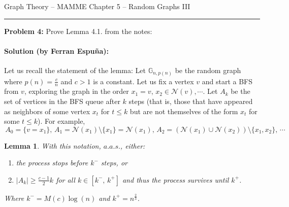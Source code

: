 \documentclass{amsart}
\theoremstyle{plain}
\newtheorem*{lemma}{\textbf{Lemma}}
\theoremstyle{definition}
\begin{document}
    {\Large Graph Theory -- MAMME}
    {\Large Chapter 5 -- Random Graphs III}

    \vspace{0.5cm}

    \hrule

    \vspace{0.5cm}

    \noindent \textbf{Problem 4:}
    Prove Lemma 4.1. from the notes:


    \paragraph{\textbf{Solution (by Ferran Espuña):}}
    Let us recall the statement of the lemma:
    Let $\mathbb{G}_{n,p(n)}$ be the random graph where $p(n) = \frac{c}{n}$ and $c > 1$ is a constant.
    Let us fix a vertex $v$ and start a BFS from $v$, exploring the graph in the order
    $x_1 = v,\, x_2 \in \mathcal{N}(v), \cdots$.
    Let $A_k$ be the set of vertices in the BFS queue after $k$ steps (that is, those that have appeared
    as neighbors of some vertex $x_t$ for $t \leq k$ but are not themselves of the form $x_t$ for some $t \leq k$).
    For example,$
    \, A_0 = \{ v = x_1 \}, \,
    A_1 = \mathcal{N}(x_1) \setminus \{x_1\} = \mathcal{N}(x_1), \,
    A_2 = (\mathcal{N}(x_1) \cup \mathcal{N}(x_2)) \setminus \{x_1, x_2\}, \, \cdots$

    \begin{lemma}
        With this notation, $a.a.s.$, either:
        \begin{enumerate}
            \item the process stops before $k^-$ steps, or \label{itm:1}
            \item $|A_k| \geq \frac{c - 1}{2}k$ for all $k \in [k^{-}, \, k^{+}]$
            and thus the process survives until $k^{+}$. \label{itm:2}
        \end{enumerate}
        Where $k^{-} = M(c)\log(n)$ and $k^{+} = n^{\frac{2}{3}}$.
    \end{lemma}
\end{document}
